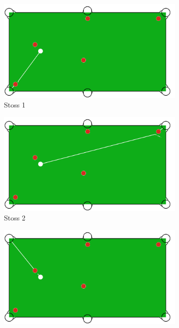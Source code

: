 \begin{figure}[h!]
    \centering
    \begin{subfigure}[b]{0.3\textwidth}
        \centering
        \includegraphics[width=1.0\linewidth]{../common/04_results/resources/simple_search/situation_diverse_solution_1.PNG}
        \caption{Stoss 1}
        \label{fig:situation_1_solution_1}
    \end{subfigure}
    \hfill
    \begin{subfigure}[b]{0.3\textwidth}
        \centering
        \includegraphics[width=1.0\linewidth]{../common/04_results/resources/simple_search/situation_diverse_solution_2.PNG}
        \caption{Stoss 2}
        \label{fig:situation_1_solution_2}
    \end{subfigure}
    \hfill
    \begin{subfigure}[b]{0.3\textwidth}
        \centering
        \includegraphics[width=1.0\linewidth]{../common/04_results/resources/simple_search/situation_diverse_solution_3.PNG}

\end{subfigure}
\end{figure}
